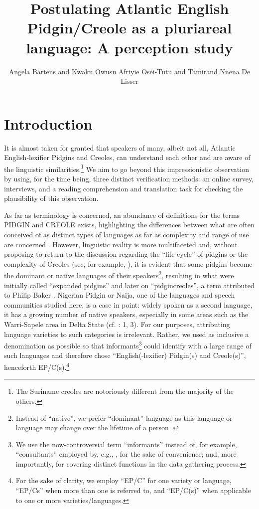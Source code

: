 \documentclass[output=paper,colorlinks,citecolor=brown]{langscibook}
\author{Angela Bartens\orcid{}\affiliation{University of Turku;University of Helsinki} and Kwaku Owusu Afriyie Osei-Tutu\affiliation{University of Ghana} and Tamirand Nnena De Lisser\affiliation{University of Guyana}}
\title[Postulating Atlantic English Pidgin\slash Creole as a pluriareal language]
      {Postulating Atlantic English Pidgin\slash Creole as a pluriareal language: A perception study}
\begin{document}
\maketitle


\section{Introduction}\label{sec:04:1}

It is almost taken for granted that speakers of many, albeit not all, Atlantic English-lexifier Pidgins and Creoles, can understand each other and are aware of the linguistic similarities.\footnote{The Suriname creoles are notoriously different from the majority of the others.} We aim to go beyond this impressionistic observation by using, for the time being, three distinct verification methods: an online survey, interviews, and a reading comprehension and translation task for checking the plausibility of this observation.

As far as terminology is concerned, an abundance of definitions for the terms PIDGIN and CREOLE exists, highlighting the differences between what are often conceived of as distinct types of languages as far as complexity and range of use are concerned \citep[cf.][6]{Bakker_Matras_2013}. However, linguistic reality is more multifaceted and, without proposing to return to the discussion regarding the “life cycle” of pidgins \citep{Hall_1962} or the complexity of Creoles (see, for example, \cite{McWhorter_2011}), it is evident that some pidgins become the dominant or native languages of their speakers\footnote{Instead of “native”, we prefer “dominant” language as this language or language may change over the lifetime of a person \citep[431]{Chernobilsky_2008}.},  resulting in what were initially called “expanded pidgins” and later on “pidgincreoles”, a term attributed to Philip Baker \citep[113]{Bakker_2008}. Nigerian Pidgin or Naija, one of the languages and speech communities studied here, is a case in point: widely spoken as a second language, it has a growing number of native speakers, especially in some areas such as the Warri-Sapele area in Delta State (cf. \cite{Deuber_2005}: 1, 3). For our purposes, attributing language varieties to such categories is irrelevant. Rather, we used as inclusive a denomination as possible so that informants\footnote{We use the now-controversial term “informants” instead of, for example, “consultants” employed by, e.g., \citet[125]{Bowern_2008}, for the sake of convenience; and, more importantly, for covering distinct functions in the data gathering process.} could identify with a large range of such languages and therefore chose “English(-lexifier) Pidgin(s) and Creole(s)”, henceforth EP/C(s).\footnote{For the sake of clarity, we employ “EP/C” for one variety or language, “EP/Cs” when more than one is referred to, and “EP/C(s)” when applicable to one or more varieties/languages.} 
\end{document}
